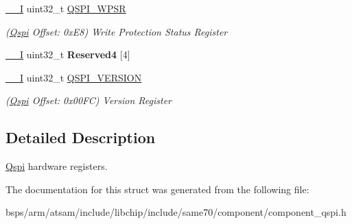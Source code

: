 \begin{DoxyCompactItemize}
\mbox{\label{structQspi_ab09bd23205fb10a7b74009efacd9d731}} 
\mbox{\hyperlink{core__cm7_8h_af63697ed9952cc71e1225efe205f6cd3}{\+\_\+\+\_\+I}} uint32\+\_\+t \mbox{\hyperlink{structQspi_ab09bd23205fb10a7b74009efacd9d731}{Q\+S\+P\+I\+\_\+\+W\+P\+SR}}
\begin{DoxyCompactList}\small\item\em (\mbox{\hyperlink{structQspi}{Qspi}} Offset\+: 0x\+E8) Write Protection Status Register \end{DoxyCompactList}\item 
\mbox{\label{structQspi_a92d6e84cc05216d44a10511ed6a119d2}} 
\mbox{\hyperlink{core__cm7_8h_af63697ed9952cc71e1225efe205f6cd3}{\+\_\+\+\_\+I}} uint32\+\_\+t {\bfseries Reserved4} \mbox{[}4\mbox{]}
\item 
\mbox{\label{structQspi_aff95e1988aaddc0588824a40c481d03d}} 
\mbox{\hyperlink{core__cm7_8h_af63697ed9952cc71e1225efe205f6cd3}{\+\_\+\+\_\+I}} uint32\+\_\+t \mbox{\hyperlink{structQspi_aff95e1988aaddc0588824a40c481d03d}{Q\+S\+P\+I\+\_\+\+V\+E\+R\+S\+I\+ON}}
\begin{DoxyCompactList}\small\item\em (\mbox{\hyperlink{structQspi}{Qspi}} Offset\+: 0x00\+FC) Version Register \end{DoxyCompactList}\end{DoxyCompactItemize}


\subsection{Detailed Description}
\mbox{\hyperlink{structQspi}{Qspi}} hardware registers. 

The documentation for this struct was generated from the following file\+:\begin{DoxyCompactItemize}
\item 
bsps/arm/atsam/include/libchip/include/same70/component/component\+\_\+qspi.\+h\end{DoxyCompactItemize}
